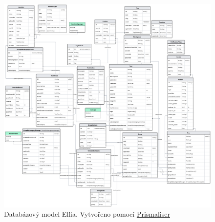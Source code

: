\documentclass[12pt, a4paper,
openright
]{report}
\begin{document}
\begin{figure}[H]
	\centering %
	\includegraphics[width=1\linewidth]{image/schema.png} 
	\caption{Databázový model Effia. Vytvořeno pomocí \href{https://github.com/Ovyerus/prismaliser}{Prismaliser}} %
	\label{fig:schema} %
\end{figure}
\end{document}

